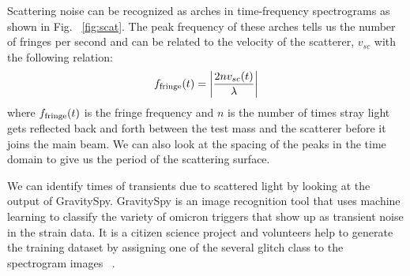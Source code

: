 \documentclass[12pt]{iopart}
\begin{document}
Scattering noise can be recognized as arches in time-frequency spectrograms as shown in Fig. ~\ref{fig:scat}. The peak frequency of these arches tells us the number of fringes per second and can be related to the velocity of the scatterer, $v_{sc}$ with the following relation:
\begin{equation}
    f_{\rm fringe}(t) = \left|\frac{2nv_{sc}(t)}{\lambda}\right|  \label{eq:3}
\end{equation}
where $f_{\rm fringe}(t)$ is the fringe frequency and $n$ is the number of times stray light gets reflected back and forth between the test mass and the scatterer before it joins the main beam. We can also look at the spacing of the peaks in the time domain to give us the period of the scattering surface. 



We can identify times of transients due to scattered light by looking at the output of GravitySpy.
GravitySpy is an image recognition tool that uses machine learning to classify the variety of omicron triggers that show up as transient noise in the strain data. It is a citizen science project and volunteers help to generate the training dataset by assigning one of the several glitch class to the spectrogram images ~\cite{gspy,gspymachine}.
\end{document}

